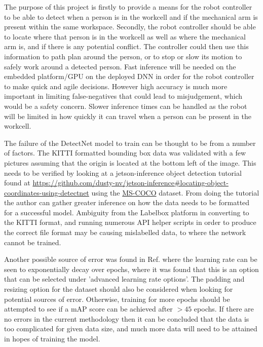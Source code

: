 \documentclass[10pt,journal,compsoc]{IEEEtran}
\begin{document}
The purpose of this project is firstly to provide a means for the robot controller to be able to detect when a person is in the workcell and if the mechanical arm is present within the same workspace. Secondly, the robot controller should be able to locate where that person is in the workcell as well as where the mechanical arm is, and if there is any potential conflict. The controller could then use this information to path plan around the person, or to stop or slow its motion to safely work around a detected person. Fast inference will be needed on the embedded platform/GPU on the deployed DNN in order for the robot controller to make quick and agile decisions. However high accuracy is much more important in limiting false-negatives that could lead to misjudgement, which would be a safety concern. Slower inference times can be handled as the robot will be limited in how quickly it can travel when a person can be present in the workcell.    

The failure of the DetectNet model to train can be thought to be from a number of factors. The KITTI formatted bounding box data was validated with a few pictures assuming that the origin is located at the bottom left of the image. This needs to be verified by looking at a jetson-inference object detection tutorial found at \href{https://github.com/dusty-nv/jetson-inference#locating-object-coordinates-using-detectnet}{https://github.com/dusty-nv/jetson-inference\#locating-object-coordinates-using-detectnet} using the \href{http://cocodataset.org/\#home}{MS-COCO} dataset. From doing the tutorial the author can gather greater inference on how the data needs to be formatted for a successful model. Ambiguity from the Labelbox platform in converting to the KITTI format, and running numerous API helper scripts in order to produce the correct file format may be causing mislabelled data, to where the network cannot be trained.

Another possible source of error was found in Ref. \cite{DNwDIGITS} where the learning rate can be seen to exponentially decay over epochs, where it was found that this is an option that can be selected under 'advanced learning rate options'. The padding and resizing option for the dataset should also be considered when looking for potential sources of error. Otherwise, training for more epochs should be attempted to see if a mAP score can be achieved after $>45$ epochs. If there are no errors in the current methodology then it can be concluded that the data is too complicated for given data size, and much more data will need to be attained in hopes of training the model.
\end{document}

